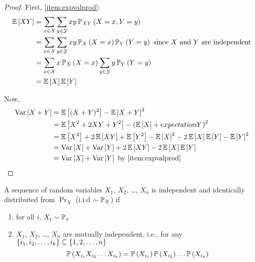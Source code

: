 \begin{proof}
    First, \cref{item:expvalprod}:
    \begin{align*}\expectation{XY}
         & = \sum_{x\in\mathcal{X}}\sum_{y\in\mathcal{Y}}xy\prob[XY]{X=x, Y=y}                                                 \\
         & = \sum_{x\in\mathcal{X}}\sum_{y\in\mathcal{Y}}xy\prob[X]{X=x}\prob[Y]{Y=y}\hbox{ since $X$ and $Y$ are independent} \\
         & = \sum_{x\in\mathcal{X}}x\prob[X]{X=x}\sum_{y\in\mathcal{Y}}y\prob[Y]{Y=y}                                          \\
         & = \expectation{X}\expectation{Y}
    \end{align*}

    Now,
    \begin{align*}\variance{X + Y}
         & = \expectation{(X + Y)^2} - \expectation{X + Y}^2                                                                                     \\
         & = \expectation{X^2 + 2XY + Y^2} - \left(\expectation{X} + expectation{Y}\right)^2                                                     \\
         & = \expectation{X^2} + 2\expectation{XY} + \expectation{Y^2} - \expectation{X}^2 - 2\expectation{X}\expectation{Y} - \expectation{Y}^2 \\
         & = \variance{X} + \variance{Y} + 2\expectation{XY} - 2\expectation{X}\expectation{Y}                                                   \\
         & = \variance{X} + \variance{Y} \hbox{ by \cref{item:expvalprod}}\qedhere
    \end{align*}
\end{proof}

\begin{definition}
    A sequence of random variables $X_1$, $X_2$, \dots, $X_n$ is independent and
    identically distributed from $\Pr_X$ (i.i.d $\sim \mathbb{P}_X$) if
    \begin{enumerate}[label=(\arabic*)]
        \item for all $i$, $X_i \sim \mathbb{P}_x$
        \item $X_1$, $X_2$, \dots, $X_n$ are mutually independent, i.e., for any
              $\left\lbrace i_1, i_2, \dots, i_k\right\rbrace \subseteq \left\lbrace1, 2, \dots, n\right\rbrace$
              \[\prob{X_{i_1}X_{i_2} \dots X_{i_k}} = \prob{X_{i_1}}\prob{X_{i_2}} \dots \prob{X_{i_k}}\]
    \end{enumerate}
\end{definition}

